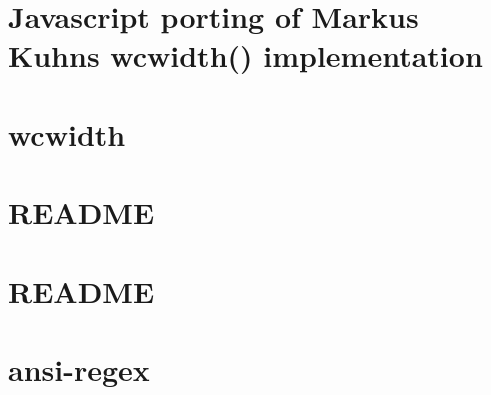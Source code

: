 \documentclass[twoside]{book}
\newcommand{\+}{\discretionary{\mbox{\scriptsize$\hookleftarrow$}}{}{}}
\begin{document}
\chapter{Javascript porting of Markus Kuhn\textquotesingle{}s wcwidth() implementation}
\label{md__c___users_vaishnavi_jadhav__desktop__developer_code_mean_stack_example_client_node_modules_wcwidth_docs_index}

\chapter{wcwidth}
\label{md__c___users_vaishnavi_jadhav__desktop__developer_code_mean_stack_example_client_node_modules_wcwidth__readme}

\chapter{README}
\label{md__c___users_vaishnavi_jadhav__desktop__developer_code_mean_stack_example_client_node_modules_w325ece2b72618bb4f95b03ff795d8eb3}

\chapter{README}
\label{md__c___users_vaishnavi_jadhav__desktop__developer_code_mean_stack_example_client_node_modules_w76e46f1b3fbabc20b0d5d5f9da8c482b}

\chapter{ansi-\/regex}
\label{md__c___users_vaishnavi_jadhav__desktop__developer_code_mean_stack_example_client_node_modules_w9cd0ed9bd59dbb77912465321e92147a}

\end{document}
